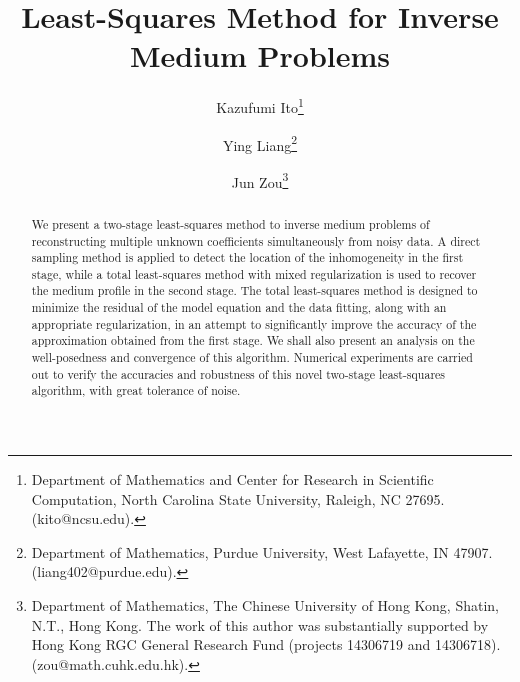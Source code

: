 \documentclass[11pt]{article}%
\renewcommand{\_}{{\fontfamily{ptm}\selectfont\textunderscore}}
\theoremstyle{plain}
\numberwithin{equation}{section}
\begin{document}
\title{ Least-Squares Method for Inverse Medium Problems}
\author{Kazufumi Ito\footnote{ Department of Mathematics and Center for Research in Scientific Computation, North Carolina State University, Raleigh, NC 27695. (kito@ncsu.edu).}
\and Ying Liang\footnote{Department of Mathematics, Purdue University, West Lafayette, IN 47907. (liang402@purdue.edu).}
 \and Jun Zou\footnote{Department of Mathematics, The Chinese University of Hong Kong, Shatin, N.T., Hong Kong. The work of this author was substantially supported by Hong Kong RGC General Research Fund (projects 14306719 and 14306718). (zou@math.cuhk.edu.hk).}}
\date{}
\maketitle
\begin{abstract}
We present a two-stage least-squares method to inverse medium problems of reconstructing multiple unknown coefficients simultaneously from noisy data. A direct sampling method is applied to detect the location of the inhomogeneity in the first stage, while a total least-squares method with mixed regularization is used to recover the medium profile in the second stage. The total least-squares method is designed to minimize the residual of the model equation and the data fitting, along with an appropriate regularization, in an attempt to significantly improve the accuracy of the approximation obtained from the first stage. 
We shall also present an analysis on the well-posedness and convergence of this algorithm.
Numerical experiments are carried out to verify the accuracies and robustness of 
this novel two-stage least-squares algorithm, with great tolerance of noise.
\end{abstract}


\end{document}
